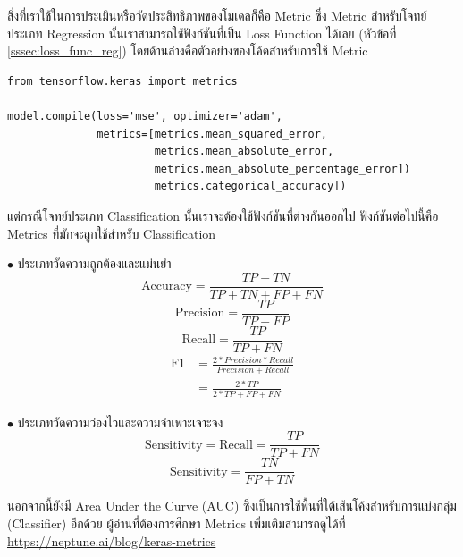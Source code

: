 สิ่งที่เราใช้ในการประเมินหรือวัดประสิทธิภาพของโมเดลก็คือ Metric ซึ่ง Metric สำหรับโจทย์ประเภท Regression นั้นเราสามารถใช้ฟังก์ชันที่เป็น Loss Function ได้เลย (หัวข้อที่ \ref{sssec:loss_func_reg}) โดยด้านล่างคือตัวอย่างของโค้ดสำหรับการใช้ Metric

\begin{lstlisting}[style=MyPython]
from tensorflow.keras import metrics

model.compile(loss='mse', optimizer='adam',
              metrics=[metrics.mean_squared_error,
                       metrics.mean_absolute_error,
                       metrics.mean_absolute_percentage_error])
                       metrics.categorical_accuracy])
\end{lstlisting}

\vspace{1em}

แต่กรณีโจทย์ประเภท Classification นั้นเราจะต้องใช้ฟังก์ชันที่ต่างกันออกไป ฟังก์ชันต่อไปนี้คือ Metrics ที่มักจะถูกใช้สำหรับ Classification

\noindent $\bullet$ ประเภทวัดความถูกต้องและแม่นยำ
%
\begin{equation}
    \text{Accuracy} = \frac{TP+TN}{TP+TN+FP+FN}
\end{equation}
%
\begin{equation}
    \text{Precision} = \frac{TP}{TP+FP}
\end{equation}
%
\begin{equation}
    \text{Recall} = \frac{TP}{TP+FN}
\end{equation}
%
\begin{align}
    \text{F1} & = \frac{2*Precision*Recall}{Precision+Recall} \nonumber \\
              & = \frac{2*TP}{2*TP+FP+FN}
\end{align}

\noindent $\bullet$ ประเภทวัดความว่องไวและความจำเพาะเจาะจง
%
\begin{equation}
    \text{Sensitivity} = \text{Recall} = \frac{TP}{TP+FN}
\end{equation}
%
\begin{equation}
    \text{Sensitivity} = \frac{TN}{FP+TN}
\end{equation}

นอกจากนี้ยังมี Area Under the Curve (AUC) ซึ่งเป็นการใช้พื้นที่ใต้เส้นโค้งสำหรับการแบ่งกลุ่ม (Classifier) อีกด้วย ผู้อ่านที่ต้องการศึกษา Metrics เพิ่มเติมสามารถดูได้ที่ \url{https://neptune.ai/blog/keras-metrics}

